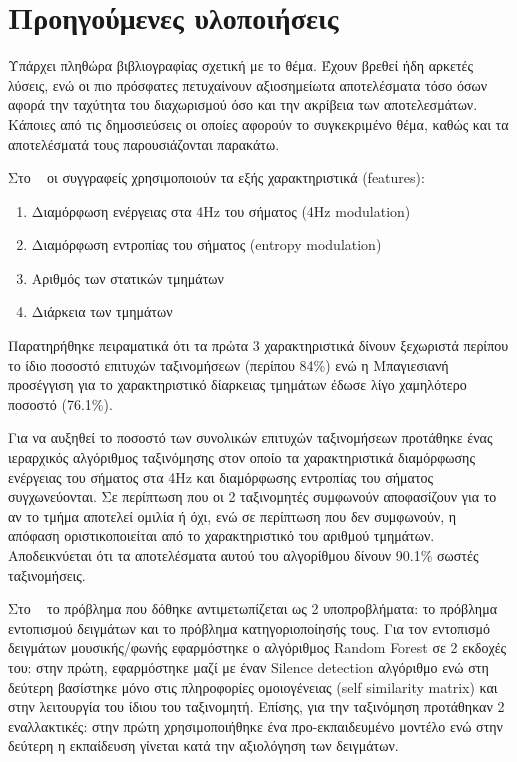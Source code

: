 \section{Προηγούμενες υλοποιήσεις}

Υπάρχει πληθώρα βιβλιογραφίας σχετική με το θέμα. Έχουν βρεθεί ήδη
αρκετές λύσεις, ενώ οι πιο πρόσφατες πετυχαίνουν αξιοσημείωτα
αποτελέσματα τόσο όσων αφορά την ταχύτητα του διαχωρισμού όσο και την ακρίβεια
των αποτελεσμάτων. Κάποιες από τις δημοσιεύσεις οι οποίες αφορούν το
συγκεκριμένο θέμα, καθώς και τα αποτελέσματά τους παρουσιάζονται παρακάτω.

\vspace{1em}
Στο ~\cite{robust} οι συγγραφείς χρησιμοποιούν τα εξής χαρακτηριστικά (features):
\begin{enumerate}[noitemsep]
\item Διαμόρφωση ενέργειας στα 4Hz του σήματος (4Hz modulation)
\item Διαμόρφωση εντροπίας του σήματος (entropy modulation)
\item Αριθμός των στατικών τμημάτων
\item Διάρκεια των τμημάτων
\end{enumerate}

Παρατηρήθηκε πειραματικά ότι τα πρώτα 3 χαρακτηριστικά δίνουν ξεχωριστά περίπου
το ίδιο ποσοστό επιτυχών ταξινομήσεων (περίπου 84\%) ενώ η Μπαγιεσιανή προσέγγιση
για το χαρακτηριστικό δίαρκειας τμημάτων έδωσε λίγο χαμηλότερο ποσοστό (76.1\%). 

Για να αυξηθεί το ποσοστό των συνολικών επιτυχών ταξινομήσεων προτάθηκε ένας
ιεραρχικός αλγόριθμος ταξινόμησης στον οποίο τα χαρακτηριστικά διαμόρφωσης
ενέργειας του σήματος στα 4Ηz και διαμόρφωσης εντροπίας του σήματος συγχωνεύονται.
Σε περίπτωση που οι 2 ταξινομητές συμφωνούν αποφασίζουν για το αν το τμήμα
αποτελεί ομιλία ή όχι, ενώ σε περίπτωση που δεν συμφωνούν, η απόφαση
οριστικοποιείται από το χαρακτηριστικό του αριθμού τμημάτων. Αποδεικνύεται ότι
τα αποτελέσματα αυτού του αλγορίθμου δίνουν 90.1\% σωστές ταξινομήσεις.

\vspace{1em}
Στο ~\cite{mirex} το πρόβλημα που δόθηκε αντιμετωπίζεται ως 2 υποπροβλήματα:
το πρόβλημα εντοπισμού δειγμάτων και το πρόβλημα κατηγοριοποίησής τους.
Για τον εντοπισμό δειγμάτων μουσικής/φωνής εφαρμόστηκε ο αλγόριθμος Random
Forest σε 2 εκδοχές του: στην πρώτη, εφαρμόστηκε μαζί με έναν Silence detection
αλγόριθμο ενώ στη δεύτερη βασίστηκε μόνο στις πληροφορίες ομοιογένειας (self
similarity matrix) και στην λειτουργία του ίδιου του ταξινομητή. Επίσης, για την
ταξινόμηση προτάθηκαν 2 εναλλακτικές: στην πρώτη χρησιμοποιήθηκε ένα
προ-εκπαιδευμένο μοντέλο ενώ στην δεύτερη η εκπαίδευση γίνεται κατά την
αξιολόγηση των δειγμάτων.

